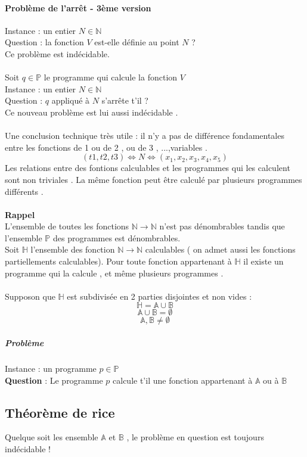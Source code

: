\documentclass[base.tex]{subfiles}
\begin{document}
\paragraph{Problème de l'arrêt - 3ème version}
Instance : un entier $N \in \mathbb{N}$\\
Question : la fonction $V$ est-elle définie au point $N$ ?\\
Ce problème est indécidable.\\
\\
Soit $q\in\mathbb{P}$ le programme qui calcule la fonction $V$\\
Instance : un entier $N \in \mathbb{N}$\\
Question : $q$ appliqué à $N$ s'arrête t'il ?\\
Ce nouveau problème est lui aussi indécidable .\\
\\
Une conclusion technique très utile : il n'y a pas de différence fondamentales entre les fonctions de 1 ou de 2 , ou de 3 , ...,variables .
\[(t1,t2,t3)\Leftrightarrow N \Leftrightarrow (x_1,x_2,x_3,x_4,x_5)\]
Les relations entre des fontions calculables et les programmes qui les calculent sont non triviales . La même fonction peut être calculé par plusieurs programmes différents .\\
\\
\textbf{Rappel} \\
L'ensemble de toutes les fonctions $\mathbb{N}\rightarrow\mathbb{N}$ n'est pas dénombrables tandis que l'ensemble $\mathbb{P}$ des programmes est dénombrables.\\
Soit $\mathbb{H}$ l'ensemble des fonction $\mathbb{N}\rightarrow\mathbb{N}$ calculables ( on admet aussi les fonctions partiellements calculables). Pour toute fonction appartenant à $\mathbb{H}$ il existe un programme qui la calcule , et même plusieurs programmes .\\
\\
Supposon que $\mathbb{H}$ est subdivisée en 2 parties disjointes et non vides :
\[\mathbb{H}=\mathbb{A}\cup \mathbb{B}\]
\[\mathbb{A}\cup \mathbb{B} = \emptyset\]
\[\mathbb{A},\mathbb{B} \neq \emptyset\]
\subparagraph{Problème}
Instance : un programme $p\in \mathbb{P} $
\\
\textbf{Question} : Le programme $p$ calcule t'il une fonction appartenant à $\mathbb{A}$ ou à $\mathbb{B}$
\subsection{Théorème de rice} %
Quelque soit les ensemble $\mathbb{A}$ et $\mathbb{B}$ , le problème en question est toujours indécidable !
\end{document}
